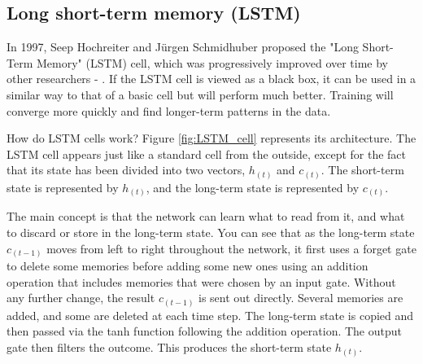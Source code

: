 \subsection{Long short-term memory (LSTM)}
In 1997, Seep Hochreiter and Jürgen Schmidhuber proposed the "Long Short-Term Memory" (LSTM) cell, which was progressively improved over time by other researchers - . If the LSTM cell is viewed as a black box, it can be used in a similar way to that of a basic cell but will perform much better. Training will converge more quickly and find longer-term patterns in the data.

How do LSTM cells work? Figure \ref{fig:LSTM_cell} represents its architecture. The LSTM cell appears just like a standard cell from the outside, except for the fact that its state has been divided into two vectors, $h_{(t)}$ and $c_{(t)}$. The short-term state is represented by $h_{(t)}$, and the long-term state is represented by $c_{(t)}$.

The main concept is that the network can learn what to read from it, and what to discard or store in the long-term state. You can see that as the long-term state $c_{(t-1)}$ moves from left to right throughout the network, it first uses a forget gate to delete some memories before adding some new ones using an addition operation that includes memories that were chosen by an input gate. Without any further change, the result $c_{(t-1)}$ is sent out directly. Several memories are added, and some are deleted at each time step. The long-term state is copied and then passed via the tanh function following the addition operation. The output gate then filters the outcome. This produces the short-term state $h_{(t)}$.



